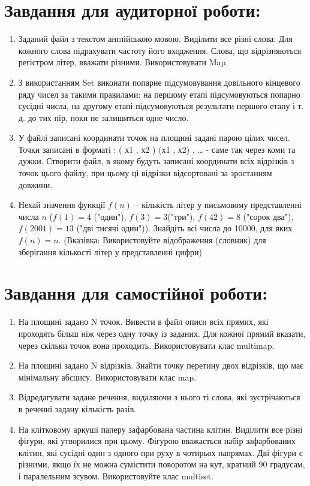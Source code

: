 \documentclass[a5paper,titlepage,openany,twoside,
]
{book_unv}%
\begin{document}
\begin{enumerate}
\begin{enumerate}
\section{Завдання для аудиторної роботи:}

\begin{enumerate}
\def\labelenumi{\arabic{enumi})}
\item
  Заданий файл з текстом англійською мовою. Виділити все різні слова.
  Для кожного слова підрахувати частоту його входження. Слова, що
  відрізняються регістром літер, вважати різними. Використовувати Map.

\item
  З використанням Set виконати попарне підсумовування довільного
  кінцевого ряду чисел за такими правилами: на першому етапі
  підсумовуються попарно сусідні числа, на другому етапі підсумовуються
  результати першого етапу і т. д. до тих пір, поки не залишиться одне
  число.
\item
  У файлі записані координати точок на площині задані парою цілих чисел.
  Точки записані в форматі : ( х1 , х2 ) (х1 , х2) , \ldots{} - саме
  так через коми та дужки. Створити файл, в якому будуть записані
  координати всіх відрізків з точок цього файлу, при цьому ці відрізки
  відсортовані за зростанням довжини.

\item
  Нехай значення функції $f(n)$ -- кількість літер у письмовому
  представленні числа $n$ ($f(1)=4$ ("один"), $f(3)=3$("три"), $f(42)=8$
  ("сорок два"), $f(2001)=13$ ("дві тисячі один")). Знайдіть всі числа до
  10000, для яких $f(n) = n$. (Вказівка: Використовуйте
  відображення (словник) для зберігання кількості літер у представленні
  цифри)

\end{enumerate}

\section{Завдання для самостійної роботи:}

\begin{enumerate}
\def\labelenumi{\arabic{enumi})}
\setcounter{enumi}{4}
\item
  На площині задано N точок. Вивести в файл описи всіх прямих, які
  проходять більш ніж через одну точку із заданих. Для кожної прямий
  вказати, через скільки точок вона проходить. Використовувати клас
  multimap.
\item
  На площині задано N відрізків. Знайти точку перетину двох відрізків,
  що має мінімальну абсцису. Використовувати клас map.
\item
  Відредагувати задане речення, видаляючи з нього ті слова, які
  зустрічаються в реченні задану кількість разів.
\item
  На клітковому аркуші паперу зафарбована частина клітин. Виділити все
  різні фігури, які утворилися при цьому. Фігурою вважається набір
  зафарбованих клітин, які сусідні один з одного при руху в чотирьох
  напрямах. Дві фігури є різними, якщо їх не можна сумістити поворотом
  на кут, кратний 90 градусам, і паралельним зсувом. Використовуйте
  клас multiset.



\end{enumerate}
\end{enumerate}
\end{enumerate}
\end{document}
